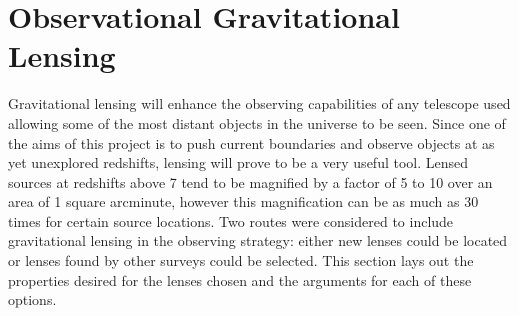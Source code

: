 
\section{Observational Gravitational Lensing} %
\label{sec:observational_gravitational_lensing}
	Gravitational lensing will enhance the observing capabilities of any telescope used allowing some of the most distant objects in the universe to be seen. Since one of the aims of this project is to push current boundaries and observe objects at as yet unexplored redshifts, lensing will prove to be a very useful tool. Lensed sources at redshifts above 7 tend to be magnified by a factor of 5 to 10 over an area of 1 square arcminute, however this magnification can be as much as 30 times for certain source locations. \cite{magnification} Two routes were considered to include gravitational lensing in the observing strategy: either new lenses could be located or lenses found by other surveys could be selected. This section lays out the properties desired for the lenses chosen and the arguments for each of these options.

